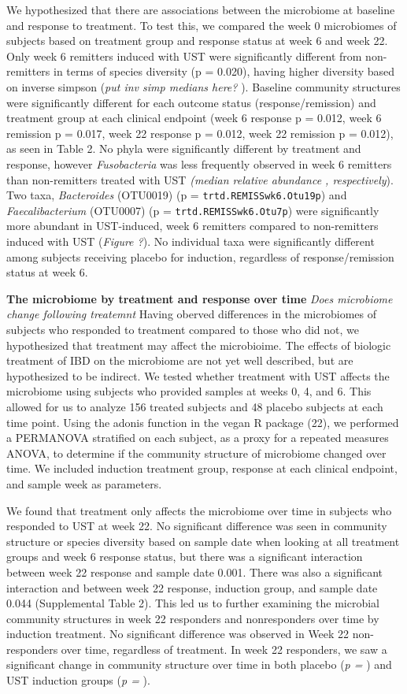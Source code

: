 \documentclass[11pt,]{article}
\begin{document}
We hypothesized that there are associations between the microbiome at
baseline and response to treatment. To test this, we compared the week 0
microbiomes of subjects based on treatment group and response status at
week 6 and week 22. Only week 6 remitters induced with UST were
significantly different from non-remitters in terms of species diversity
(p = 0.020), having higher diversity based on inverse simpson (\emph{put
inv simp medians here? }). Baseline community structures were
significantly different for each outcome status (response/remission) and
treatment group at each clinical endpoint (week 6 response p = 0.012,
week 6 remission p = 0.017, week 22 response p = 0.012, week 22
remission p = 0.012), as seen in Table 2. No phyla were significantly
different by treatment and response, however \emph{Fusobacteria} was
less frequently observed in week 6 remitters than non-remitters treated
with UST \emph{(median relative abundance , respectively}). Two taxa,
\emph{Bacteroides} (OTU0019) (p = \texttt{trtd.REMISSwk6.Otu19p}) and
\emph{Faecalibacterium} (OTU0007) (p = \texttt{trtd.REMISSwk6.Otu7p})
were significantly more abundant in UST-induced, week 6 remitters
compared to non-remitters induced with UST (\emph{Figure ?}). No
individual taxa were significantly different among subjects receiving
placebo for induction, regardless of response/remission status at week
6.

\textbf{The microbiome by treatment and response over time} \emph{Does
microbiome change following treatemnt} Having oberved differences in the
microbiomes of subjects who responded to treatment compared to those who
did not, we hypothesized that treatment may affect the microbioime. The
effects of biologic treatment of IBD on the microbiome are not yet well
described, but are hypothesized to be indirect. We tested whether
treatment with UST affects the microbiome using subjects who provided
samples at weeks 0, 4, and 6. This allowed for us to analyze 156 treated
subjects and 48 placebo subjects at each time point. Using the adonis
function in the vegan R package (22), we performed a PERMANOVA
stratified on each subject, as a proxy for a repeated measures ANOVA, to
determine if the community structure of microbiome changed over time. We
included induction treatment group, response at each clinical endpoint,
and sample week as parameters.

We found that treatment only affects the microbiome over time in
subjects who responded to UST at week 22. No significant difference was
seen in community structure or species diversity based on sample date
when looking at all treatment groups and week 6 response status, but
there was a significant interaction between week 22 response and sample
date 0.001. There was also a significant interaction and between week 22
response, induction group, and sample date 0.044 (Supplemental Table 2).
This led us to further examining the microbial community structures in
week 22 responders and nonresponders over time by induction treatment.
No significant difference was observed in Week 22 non-responders over
time, regardless of treatment. In week 22 responders, we saw a
significant change in community structure over time in both placebo
(\emph{p = }) and UST induction groups (\emph{p = }).
\end{document}
